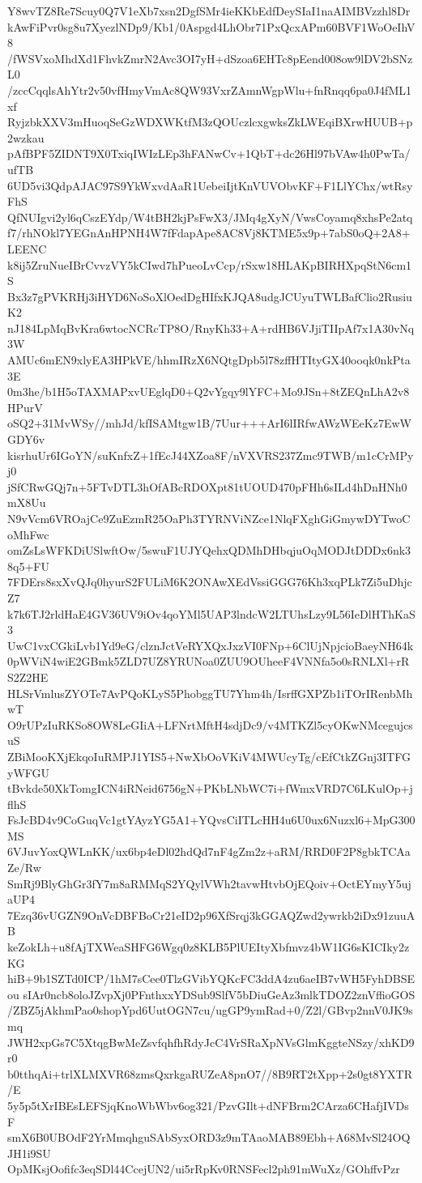 Y8wvTZ8Re7Scuy0Q7V1eXb7xsn2DgfSMr4ieKKbEdfDeySIaI1naAIMBVzzhl8Dr
kAwFiPvr0sg8u7XyezlNDp9/Kb1/0Aspgd4LhObr71PxQcxAPm60BVF1WoOeIhV8
/fWSVxoMhdXd1FhvkZmrN2Avc3OI7yH+dSzoa6EHTc8pEend008ow9lDV2bSNzL0
/zccCqqlsAhYtr2v50vfHmyVmAc8QW93VxrZAmnWgpWlu+fnRnqq6pa0J4fML1xf
RyjzbkXXV3mHuoqSeGzWDXWKtfM3zQOUczlcxgwksZkLWEqiBXrwHUUB+p2wzkau
pAfBPF5ZIDNT9X0TxiqIWIzLEp3hFANwCv+1QbT+dc26Hl97bVAw4h0PwTa/ufTB
6UD5vi3QdpAJAC97S9YkWxvdAaR1UebeiIjtKnVUVObvKF+F1LlYChx/wtRsyFhS
QfNUIgvi2yl6qCszEYdp/W4tBH2kjPsFwX3/JMq4gXyN/VwsCoyamq8xhsPe2atq
f7/rhNOkl7YEGnAnHPNH4W7fFdapApe8AC8Vj8KTME5x9p+7abS0oQ+2A8+LEENC
k8ij5ZruNueIBrCvvzVY5kCIwd7hPueoLvCcp/rSxw18HLAKpBIRHXpqStN6cm1S
Bx3z7gPVKRHj3iHYD6NoSoXlOedDgHIfxKJQA8udgJCUyuTWLBafClio2RusiuK2
nJ184LpMqBvKra6wtocNCRcTP8O/RnyKh33+A+rdHB6VJjiTIIpAf7x1A30vNq3W
AMUc6mEN9xlyEA3HPkVE/hhmIRzX6NQtgDpb5l78zffHTItyGX40ooqk0nkPta3E
0m3he/b1H5oTAXMAPxvUEglqD0+Q2vYgqy9lYFC+Mo9JSn+8tZEQnLhA2v8HPurV
oSQ2+31MvWSy//mhJd/kfISAMtgw1B/7Uur+++ArI6lIRfwAWzWEeKz7EwWGDY6v
kisrhuUr6IGoYN/suKnfxZ+1fEcJ44XZoa8F/nVXVRS237Zmc9TWB/m1cCrMPyj0
jSfCRwGQj7n+5FTvDTL3hOfABcRDOXpt81tUOUD470pFHh6sILd4hDnHNh0mX8Uu
N9vVcm6VROajCe9ZuEzmR25OaPh3TYRNViNZce1NlqFXghGiGmywDYTwoCoMhFwc
omZsLsWFKDiUSlwftOw/5swuF1UJYQehxQDMhDHbqjuOqMODJtDDDx6nk38q5+FU
7FDErs8sxXvQJq0hyurS2FULiM6K2ONAwXEdVssiGGG76Kh3xqPLk7Zi5uDhjcZ7
k7k6TJ2rldHaE4GV36UV9iOv4qoYMl5UAP3lndcW2LTUhsLzy9L56IeDlHThKaS3
UwC1vxCGkiLvb1Yd9eG/clznJctVeRYXQxJxzVI0FNp+6ClUjNpjcioBaeyNH64k
0pWViN4wiE2GBmk5ZLD7UZ8YRUNoa0ZUU9OUheeF4VNNfa5o0sRNLXl+rRS2Z2HE
HLSrVmlusZYOTe7AvPQoKLyS5PhobggTU7Yhm4h/IsrffGXPZb1iTOrIRenbMhwT
O9rUPzIuRKSo8OW8LeGIiA+LFNrtMftH4sdjDc9/v4MTKZl5cyOKwNMcegujcsuS
ZBiMooKXjEkqoIuRMPJ1YIS5+NwXbOoVKiV4MWUcyTg/cEfCtkZGnj3ITFGyWFGU
tBvkde50XkTomgICN4iRNeid6756gN+PKbLNbWC7i+fWmxVRD7C6LKulOp+jflhS
FsJcBD4v9CoGuqVc1gtYAyzYG5A1+YQvsCiITLcHH4u6U0ux6Nuzxl6+MpG300MS
6VJuvYoxQWLnKK/ux6bp4eDl02hdQd7nF4gZm2z+aRM/RRD0F2P8gbkTCAaZe/Rw
SmRj9BlyGhGr3fY7m8aRMMqS2YQylVWh2tavwHtvbOjEQoiv+OctEYmyY5ujaUP4
7Ezq36vUGZN9OnVcDBFBoCr21eID2p96XfSrqj3kGGAQZwd2ywrkb2iDx91zuuAB
keZokLh+u8fAjTXWeaSHFG6Wgq0z8KLB5PlUEItyXbfmvz4bW1IG6sKICIky2zKG
hiB+9b1SZTd0ICP/1hM7sCee0TlzGVibYQKcFC3ddA4zu6aeIB7vWH5FyhDBSEou
sIAr0ncb8oloJZvpXj0PFnthxxYDSub9SlfV5bDiuGeAz3mlkTDOZ2znVffioGOS
/ZBZ5jAkhmPao0shopYpd6UutOGN7cu/ugGP9ymRad+0/Z2l/GBvp2nnV0JK9smq
JWH2xpGs7C5XtqgBwMeZsvfqhfhRdyJcC4VrSRaXpNVsGlmKggteNSzy/xhKD9r0
b0tthqAi+trlXLMXVR68zmsQxrkgaRUZeA8pnO7//8B9RT2tXpp+2s0gt8YXTR/E
5y5p5tXrIBEsLEFSjqKnoWbWbv6og321/PzvGIlt+dNFBrm2CArza6CHafjIVDsF
smX6B0UBOdF2YrMmqhguSAbSyxORD3z9mTAaoMAB89Ebh+A68MvSl24OQJH1i9SU
OpMKsjOofifc3eqSDl44CcejUN2/ui5rRpKv0RNSFecl2ph91mWuXz/GOhffvPzr
